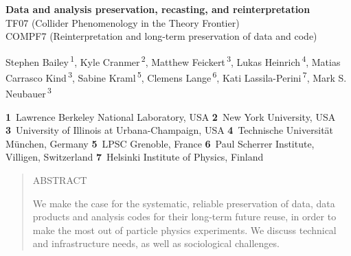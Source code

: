 \documentclass[11pt]{article}
\newcommand\pubnumber{DRAFT}
\newcommand\pubdate{\today}
\def\Title#1{\begin{center} {\LARGE #1 } \end{center}}
\newcommand\pubblock{\rightline{\begin{tabular}{l} \pubnumber\\
         \pubdate \end{tabular}}}
\newenvironment{Abstract}{\begin{quotation} \begin{center}
                       ABSTRACT
     \end{center}\bigskip  }{\end{quotation}}
\begin{document}
\pubblock

\snowmass{}

\Title{{\bf Data and analysis preservation, recasting, and reinterpretation}\\
\vspace{10pt}%
TF07 (Collider Phenomenology in the Theory Frontier)\\
\vspace{10pt}%
COMPF7 (Reinterpretation and long-term preservation of data and code)}

\medskip


\begin{center}
Stephen Bailey\,\textsuperscript{1},
Kyle Cranmer\,\textsuperscript{2},
Matthew Feickert\,\textsuperscript{3},
Lukas Heinrich\,\textsuperscript{4},
Matias Carrasco Kind\,\textsuperscript{3},
Sabine Kraml\,\textsuperscript{5},
Clemens Lange\,\textsuperscript{6},
Kati Lassila-Perini\,\textsuperscript{7},
Mark S. Neubauer\,\textsuperscript{3}
\end{center}



\begin{center}
\textbf{1}~Lawrence Berkeley National Laboratory, USA
\textbf{2}~New York University, USA
\textbf{3}~University of Illinois at Urbana-Champaign, USA
\textbf{4}~Technische Universität München, Germany
\textbf{5}~LPSC Grenoble, France
\textbf{6}~Paul Scherrer Institute, Villigen, Switzerland
\textbf{7}~Helsinki Institute of Physics, Finland
\end{center}

\begin{Abstract}
\noindent We make the case for the systematic, reliable preservation of data, data products and analysis codes for their long-term future reuse, in order to make the most out of particle physics experiments. We discuss technical and infrastructure needs, as well as sociological challenges.
\end{Abstract}
\end{document}
